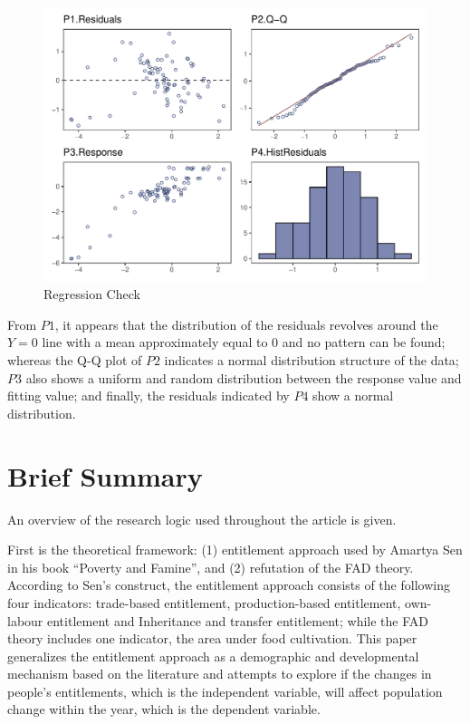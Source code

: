 \begin{figure}[h]
    \centering
    \caption{Regression Check}
    \includegraphics[width=.9\textwidth]{../03_outputs/regcheck.pdf}
\end{figure}
\vspace{-7pt}

From $P1$, it appears that the distribution of the residuals revolves around the $Y=0$ line with a mean approximately equal to 0 and no pattern can be found; whereas the Q-Q plot of $P2$ indicates a normal distribution structure of the data; $P3$ also shows a uniform and random distribution between the response value and fitting value; and finally, the residuals indicated by $P4$ show a normal distribution.

\section{Brief Summary}

An overview of the research logic used throughout the article is given.

First is the theoretical framework: (1) entitlement approach used by Amartya Sen in his book ``Poverty and Famine'', and (2) refutation of the FAD theory. According to Sen's construct, the entitlement approach consists of the following four indicators: trade-based entitlement, production-based entitlement, own-labour entitlement and Inheritance and transfer entitlement; while the FAD theory includes one indicator, the area under food cultivation. This paper generalizes the entitlement approach as a demographic and developmental mechanism based on the literature and attempts to explore if the changes in people's entitlements, which is the independent variable, will affect population change within the year, which is the dependent variable.

